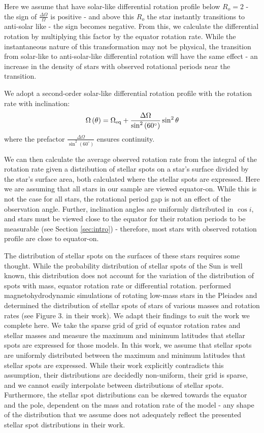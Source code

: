 Here we assume that have solar-like differential rotation profile below $R_o = 2$ - the sign of $\frac{\Delta \Omega}{\Omega}$ is positive - and above this $R_o$ the star instantly transitions to anti-solar like - the sign becomes negative. 
From this, we calculate the differential rotation by multiplying this factor by the equator rotation rate.
While the instantaneous nature of this transformation may not be physical, the transition from solar-like to anti-solar-like differential rotation will have the same effect - an increase in the density of stars with observed rotational periods near the transition.

We adopt a second-order solar-like differential rotation profile with the rotation rate with inclination:
\begin{equation}
    \Omega\left(\theta\right) = \Omega_{\rm{eq}} + \frac{\Delta \Omega}{\sin^{2}\left(60^{\circ}\right)} \sin^2{\theta}
\end{equation}
where the prefactor $\frac{\Delta \Omega}{\sin^{2}\left(60^{\circ}\right)}$ ensures continuity.

We can then calculate the average observed rotation rate from the integral of the rotation rate given a distribution of stellar spots on a star's surface divided by the star's surface area, both calculated where the stellar spots are expressed.
Here we are assuming that all stars in our sample are viewed equator-on.
While this is not the case for all stars, the rotational period gap is not an effect of the observation angle.
Further, inclination angles are uniformly distributed in $\cos{i}$, and stars must be viewed close to the equator for their rotation periods to be measurable (see Section \ref{sec:intro}) - therefore, most stars with observed rotation profile are close to equator-on.

The distribution of stellar spots on the surfaces of these stars requires some thought.
While the probability distribution of stellar spots of the Sun is well known, this distribution does not account for the variation of the distribution of spots with mass, equator rotation rate or differential rotation.
 \citet{granzer_spotted_2003} performed magnetohydrodynamic simulations of rotating low-mass stars in the Pleiades and determined the distribution of stellar spots of stars of various masses and rotation rates (see Figure 3. in their work).
We adapt their findings to suit the work we complete here.
We take the sparse grid of grid of equator rotation rates and stellar masses and measure the maximum and minimum latitudes that stellar spots are expressed for those models.
 In this work, we assume that stellar spots are uniformly distributed between the maximum and minimum latitudes that stellar spots are expressed.
 While their work explicitly contradicts this assumption, their distributions are decidedly non-uniform, their grid is sparse, and we cannot easily interpolate between distributions of stellar spots.
 Furthermore, the stellar spot distributions can be skewed towards the equator and the pole, dependent on the mass and rotation rate of the model - any shape of the distribution that we assume does not adequately reflect the presented stellar spot distributions in their work.

